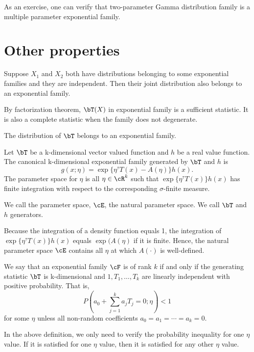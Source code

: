 As an exercise, one can verify that two-parameter Gamma
distribution family is a multiple parameter exponential family.

\section{Other properties}

Suppose $X_1$ and $X_2$ both have distributions
belonging to some exponential families and they are independent.
Then their joint distribution also belongs to an exponential
family.

By factorization theorem, $\bT(X)$ in exponential family
is a sufficient statistic. It is also a complete statistic when
the family does not degenerate.

The distribution of $\bT$ belongs to an exponential family.

\begin{defi}
Let $\bT$ be a k-dimensional vector valued function
and $h$ be a real value function. The canonical k-dimensional
exponential family generated by $\bT$ and $h$ is 
\[
g(x; \eta) 
=
\exp\{ \eta^\tau T(x) - A(\eta) \} h(x).
\]
The parameter space for $\eta$ is all $\eta \in \cR^k$ such
that $\exp\{\eta^\tau T(x)\} h(x)$ has finite integration with
respect to the corresponding $\sigma$-finite measure.

We call the parameter space, $\cE$, the natural parameter
space. We call $\bT$ and $h$ generators.
\end{defi}

Because the integration of a density function equals 1,
the integration of $\exp\{ \eta^\tau T(x)\} h(x)$ equals
$\exp(A(\eta)$ if it is finite. Hence, the natural parameter
space $\cE$ contains all $\eta$ at which $A(\cdot)$ is well-defined.

\begin{defi}
We say that an exponential family $\cF$ is of rank $k$ if and only
if the generating statistic $\bT$ is k-dimensional and 
$1, T_1, \ldots, T_k$ are linearly independent with positive
probability. That is,
\[
P( a_0 + \sum_{j=1}^k a_j T_j =0; \eta) < 1
\]
for some $\eta$ unless all non-random coefficients
$a_0 = a_1 = \cdots = a_k = 0$.
\end{defi}

In the above definition, we only need to verify the probability
inequality for one $\eta$ value. If it is satisfied for one $\eta$
value, then it is satisfied for any other $\eta$ value.

